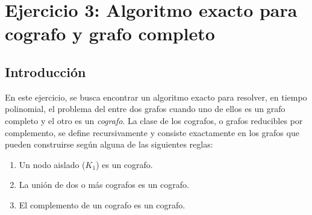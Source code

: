 \section{Ejercicio 3: Algoritmo exacto para cografo y grafo completo}


\subsection{Introducción}
En este ejercicio, se busca encontrar un algoritmo exacto para resolver, en
tiempo polinomial, el problema del  entre dos grafos cuando uno de
ellos es un grafo completo y el otro es un \emph{cografo}. La clase de los
cografos, o grafos reducibles por complemento, se define recursivamente y
consiste exactamente en los grafos que pueden construirse según alguna de las
siguientes reglas:
\begin{enumerate}
    \item Un nodo aislado ($K_1$) es un cografo.
    \item La unión de dos o más cografos es un cografo.
    \item El complemento de un cografo es un cografo.
\end{enumerate}


